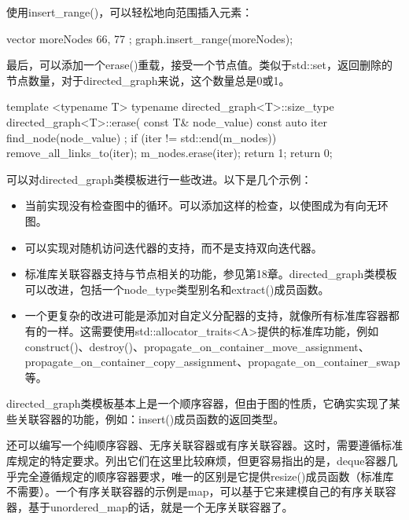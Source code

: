 使用insert\_range()，可以轻松地向范围插入元素：

\begin{cpp}
vector moreNodes { 66, 77 };
graph.insert_range(moreNodes);
\end{cpp}

最后，可以添加一个erase()重载，接受一个节点值。类似于std::set，返回删除的节点数量，对于directed\_graph来说，这个数量总是0或1。

\begin{cpp}
template <typename T>
typename directed_graph<T>::size_type directed_graph<T>::erase(
    const T& node_value)
{
    const auto iter { find_node(node_value) };
    if (iter != std::end(m_nodes)) {
        remove_all_links_to(iter);
        m_nodes.erase(iter);
        return 1;
    }
    return 0;
}
\end{cpp}


可以对directed\_graph类模板进行一些改进。以下是几个示例：

\begin{itemize}
\item
当前实现没有检查图中的循环。可以添加这样的检查，以使图成为有向无环图。

\item
可以实现对随机访问迭代器的支持，而不是支持双向迭代器。

\item
标准库关联容器支持与节点相关的功能，参见第18章。directed\_graph类模板可以改进，包括一个node\_type类型别名和extract()成员函数。

\item
一个更复杂的改进可能是添加对自定义分配器的支持，就像所有标准库容器都有的一样。这需要使用std::allocator\_traits<A>提供的标准库功能，例如construct()、destroy()、propagate\_on\_container\_move\_assignment、propagate\_on\_container\_copy\_assignment、propagate\_on\_container\_swap等。
\end{itemize}


directed\_graph类模板基本上是一个顺序容器，但由于图的性质，它确实实现了某些关联容器的功能，例如：insert()成员函数的返回类型。

还可以编写一个纯顺序容器、无序关联容器或有序关联容器。这时，需要遵循标准库规定的特定要求。列出它们在这里比较麻烦，但更容易指出的是，deque容器几乎完全遵循规定的顺序容器要求，唯一的区别是它提供resize()成员函数（标准库不需要）。一个有序关联容器的示例是map，可以基于它来建模自己的有序关联容器，基于unordered\_map的话，就是一个无序关联容器了。


